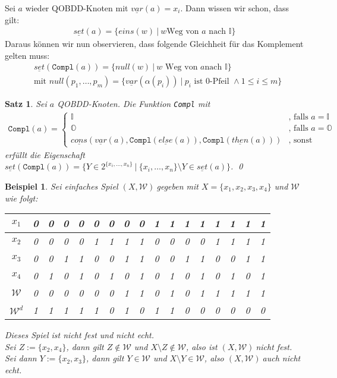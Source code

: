 \documentclass[ngerman]{scrartcl}
\theoremstyle{custom}
\newtheorem{mex}[mdef]{Beispiel}
\newtheorem{ms}[mdef]{Satz}
\newcommand{\0}{\mathbf{0}}
\newcommand{\1}{\mathbf{L}}
\newcommand{\then}{\underline{then}}
\newcommand{\el}{\underline{else}}
\newcommand{\var}{\underline{var}}
\newcommand{\set}{\underline{set}}
\newcommand{\cons}{\underline{cons}}
\newcommand{\sg}{$(X,\mathcal{W})~$}
\newcommand{\W}{\mathcal{W}}
\begin{document}
Sei $a$ wieder QOBDD-Knoten mit $\var(a) = x_i$. Dann wissen wir
schon, dass gilt:
\begin{align*}
\set(a) = \{eins(w) ~|~ w \text{Weg von } a \text{ nach } \mathds{I}\}
\end{align*}
Daraus k\"onnen wir nun observieren, dass folgende Gleichheit f\"ur
das Komplement gelten muss:
\begin{align*}
&\set(\texttt{Compl}(a)) =\{null(w) ~|~ w \text{ Weg von } a \text{
  nach } \mathds{I}\}\\
&\text{mit } null(p_1,\dots,p_m) =
\{\var(\alpha(p_i)) ~|~ p_i \text{ ist 0-Pfeil } \wedge 1 \leq i \leq m\}
\end{align*}

\begin{ms}
Sei $a$ QOBDD-Knoten. Die Funktion \texttt{Compl} mit
\begin{align*}
\texttt{Compl}(a) = \begin{cases} \mathds{I} &\text{, falls }
  a=\mathds{I}\\
\mathds{O} &\text{, falls } a = \mathds{O}\\
\cons(\var(a),\texttt{Compl}(\el(a)), \texttt{Compl}(\then(a)))
&\text{, sonst}
\end{cases}
\end{align*}
erf\"ullt die Eigenschaft $\set(\texttt{Compl}(a)) = \{ Y \in
2^{\{x_i,\dots,x_n\}} ~|~ \{x_i,\dots,x_n\} \setminus Y \in \set(a)\}$.
\qed
\end{ms}

\begin{mex}
Sei einfaches Spiel \sg gegeben mit $X = \{x_1,x_2,x_3,x_4\}$ und $\W$
wie folgt:
\begin{table}[h]
\begin{tabular}[h]{|c||c|c|c|c|c|c|c|c|c|c|c|c|c|c|c|c|}
\hline $x_1$ &   0&0&0&0&0&0&0&0&1&1&1&1&1&1&1&1 \\
\hline $x_2$ &   0&0&0&0&1&1&1&1&0&0&0&0&1&1&1&1 \\
\hline $x_3$ &   0&0&1&1&0&0&1&1&0&0&1&1&0&0&1&1 \\
\hline $x_4$ &   0&1&0&1&0&1&0&1&0&1&0&1&0&1&0&1 \\
\hline \hline $\W$ &    0&0&0&0&0&0&1&1&0&1&0&1&1&1&1&1 \\
\hline $\W^d$ &1&1&1&1&1&0&1&0&1&1&0&0&0&0&0&0 \\
\hline
\end{tabular}
\end{table}
\newline
Dieses Spiel ist nicht fest und nicht echt.\\
Sei $Z := \{x_2,x_4\}$, dann gilt $Z \not \in \W$ und $X \setminus Z
\not \in \W$, also ist \sg nicht fest.\\
Sei dann $Y := \{x_2,x_3\}$, dann gilt $Y \in \W$ und $X \setminus Y
\in \W$, also \sg auch nicht echt.
\end{mex} 
\end{document}
